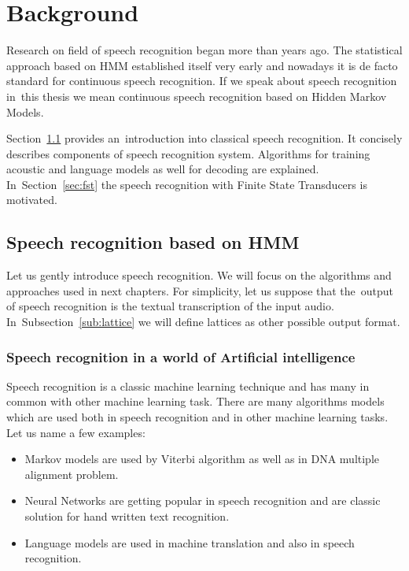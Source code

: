 \chapter{Background}
\label{cha:background}

% 
% 

Research on field of speech recognition began more than  years ago. The statistical approach based on \ac{HMM} established itself very early and nowadays it is de facto standard for continuous speech recognition. If we speak about speech recognition in~this thesis we mean continuous speech recognition based on Hidden Markov Models. 

Section~\ref{sec:general_introduction} provides an~introduction into classical speech recognition. It concisely describes components of speech recognition system. Algorithms for training acoustic and language models as well for decoding are explained. In~Section~\ref{sec:fst} the speech recognition with Finite State Transducers is motivated.

\section{Speech recognition based on \ac{HMM}} 
\label{sec:general_introduction}
Let us gently introduce speech recognition. We will focus on the algorithms and approaches used in next chapters. For simplicity,
let us suppose that the~output of speech recognition is the textual transcription of the input audio. In~Subsection~\ref{sub:lattice} we will define
lattices as other possible output format.

\subsection*{Speech recognition in a world of Artificial intelligence}
\label{sub:intro_ml}
Speech recognition is a classic machine learning technique and has many in common with other machine learning task. There are many algorithms models which are used both in speech recognition and in other machine learning tasks.
Let us name a few examples:
\begin{itemize}
    \item Markov models are used by Viterbi algorithm as well as in \ac{DNA} multiple alignment problem.
    \item Neural Networks are getting popular in speech recognition and are classic solution for hand written text recognition.
    \item Language models are used in machine translation and also in speech recognition. 
\end{itemize}

